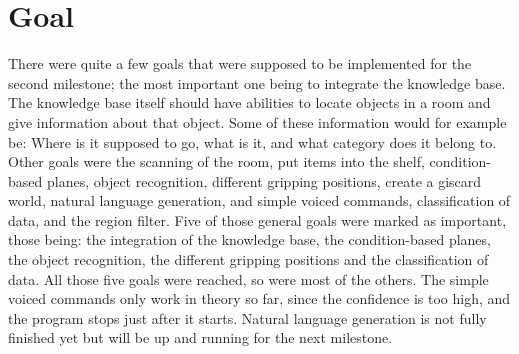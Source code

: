 \documentclass[main.tex]{subfiles}
\begin{document}
	
    \chapter{Goal}
		
    There were quite a few goals that were supposed to be implemented for the second milestone; the most important one being to integrate the knowledge base. The knowledge base itself should have abilities to locate objects in a room and give information about that object. Some of these information would for example be: Where is it supposed to go, what is it, and what category does it belong to.
    Other goals were the scanning of the room, put items into the shelf, condition-based planes, object recognition, different gripping positions, create a giscard world, natural language generation, and simple voiced commands, classification of data, and the region filter. 
    Five of those general goals were marked as important, those being: the integration of the knowledge base, the condition-based planes, the object recognition, the different gripping positions and the classification of data. All those five goals were reached, so were most of the others. The simple voiced commands only work in theory so far, since the confidence is too high, and the program stops just after it starts. Natural language generation is not fully finished yet but will be up and running for the next milestone.
    
\end{document}
